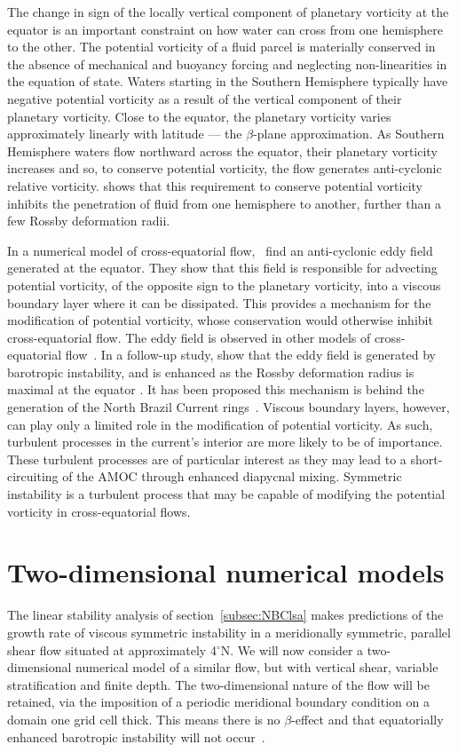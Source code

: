 The change in sign of the locally vertical component of planetary vorticity at the equator is an important constraint on how water can cross from one hemisphere to the other. The potential vorticity of a fluid parcel is materially conserved in the absence of mechanical and buoyancy forcing and neglecting non-linearities in the equation of state. Waters starting in the Southern Hemisphere typically have negative potential vorticity as a result of the vertical component of their planetary vorticity. Close to the equator, the planetary vorticity varies approximately linearly with latitude --- the $\beta$-plane approximation. As Southern Hemisphere waters flow northward across the equator, their planetary vorticity increases and so, to conserve potential vorticity, the flow generates anti-cyclonic relative vorticity. \citet{Killworth1991} shows that this requirement to conserve potential vorticity inhibits the penetration of fluid from one hemisphere to another, further than a few Rossby deformation radii.

In a numerical model of cross-equatorial flow,~\citet{Edwards1998I} find an anti-cyclonic eddy field generated at the equator. They show that this field is responsible for advecting potential vorticity, of the opposite sign to the planetary vorticity, into a viscous boundary layer where it can be dissipated. This provides a mechanism for the modification of potential vorticity, whose conservation would otherwise inhibit cross-equatorial flow. The eddy field is observed in other models of cross-equatorial flow~\citep[e.g.][]{Jochum2003, Goes2009}. In a follow-up study, \citet{Edwards1998II} show that the eddy field is generated by barotropic instability, and is enhanced as the Rossby deformation radius is maximal at the equator \citep{Chelton1998}. It has been proposed this mechanism is behind the generation of the North Brazil Current rings~\citep{Jochum2003}. Viscous boundary layers, however, can play only a limited role in the modification of potential vorticity. As such, turbulent processes in the current's interior are more likely to be of importance. These turbulent processes are of particular interest as they may lead to a short-circuiting of the AMOC through enhanced diapycnal mixing. Symmetric instability is a turbulent process that may be capable of modifying the potential vorticity in cross-equatorial flows.

\section{Two-dimensional numerical models}
\label{sec:2DModels}
The linear stability analysis of section~\ref{subsec:NBClsa} makes predictions of the growth rate of viscous symmetric instability in a meridionally symmetric, parallel shear flow situated at approximately 4$^\circ$N. We will now consider a two-dimensional numerical model of a similar flow, but with vertical shear, variable stratification and finite depth. The two-dimensional nature of the flow will be retained, via the imposition of a periodic meridional boundary condition on a domain one grid cell thick. This means there is no $\beta$-effect and that equatorially enhanced barotropic instability will not occur~\citep{Edwards1998I, Edwards1998II}.

